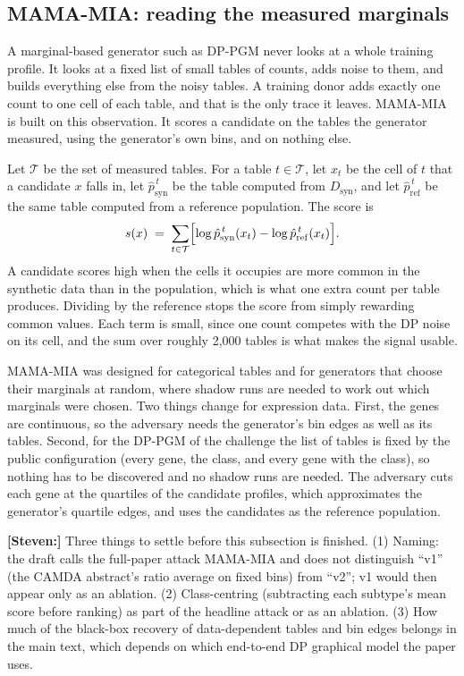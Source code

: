 \documentclass[webpdf,contemporary,large]{oup-authoring-template}
\newif\ifdraft \drafttrue
\newcommand{\annot}[3]{\ifdraft\textcolor{#1}{\textbf{[#2:]} #3}\fi}
\newcommand{\steven}[1]{\annot{Periwinkle}{Steven}{#1}}
\newcommand{\Dsyn}{D_{\mathrm{syn}}}
\newcommand{\mama}{\textsc{MAMA-MIA}}
\begin{document}
\subsection{\mama{}: reading the measured marginals}
\label{sec:mamamia}

A marginal-based generator such as DP-PGM never looks at a whole training profile. It looks at a fixed list of small tables of counts, adds noise to them, and builds everything else from the noisy tables. A training donor adds exactly one count to one cell of each table, and that is the only trace it leaves. \mama{} \citep{golob_privacy_2025} is built on this observation. It scores a candidate on the tables the generator measured, using the generator's own bins, and on nothing else.

Let $\mathcal{T}$ be the set of measured tables. For a table $t \in \mathcal{T}$, let $x_t$ be the cell of $t$ that a candidate $x$ falls in, let $\hat{p}^{\,t}_{\mathrm{syn}}$ be the table computed from $\Dsyn$, and let $\hat{p}^{\,t}_{\mathrm{ref}}$ be the same table computed from a reference population. The score is
\begin{equation}
  s(x) \;=\; \sum_{t \in \mathcal{T}} \Bigl[ \log \hat{p}^{\,t}_{\mathrm{syn}}(x_t) - \log \hat{p}^{\,t}_{\mathrm{ref}}(x_t) \Bigr] .
  \label{eq:mama}
\end{equation}
A candidate scores high when the cells it occupies are more common in the synthetic data than in the population, which is what one extra count per table produces. Dividing by the reference stops the score from simply rewarding common values. Each term is small, since one count competes with the DP noise on its cell, and the sum over roughly 2{,}000 tables is what makes the signal usable.

\mama{} was designed for categorical tables and for generators that choose their marginals at random, where shadow runs are needed to work out which marginals were chosen. Two things change for expression data. First, the genes are continuous, so the adversary needs the generator's bin edges as well as its tables. Second, for the DP-PGM of the challenge the list of tables is fixed by the public configuration (every gene, the class, and every gene with the class), so nothing has to be discovered and no shadow runs are needed. The adversary cuts each gene at the quartiles of the candidate profiles, which approximates the generator's quartile edges, and uses the candidates as the reference population.

\steven{Three things to settle before this subsection is finished. (1) Naming: the draft calls the full-paper attack \mama{} and does not distinguish ``v1'' (the CAMDA abstract's ratio average on fixed bins) from ``v2''; v1 would then appear only as an ablation. (2) Class-centring (subtracting each subtype's mean score before ranking) as part of the headline attack or as an ablation. (3) How much of the black-box recovery of data-dependent tables and bin edges belongs in the main text, which depends on which end-to-end DP graphical model the paper uses.}
\end{document}
